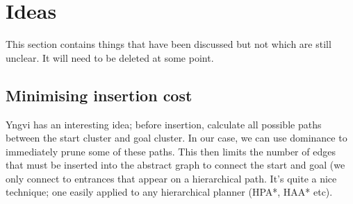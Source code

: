\section{Ideas}
This section contains things that have been discussed but not which are still unclear. 
It will need to be deleted at some point.

\subsection{Minimising insertion cost}
Yngvi has an interesting idea; before insertion, calculate all possible paths between the start cluster and goal cluster. 
In our case, we can use dominance to immediately prune some of these paths. 
This then limits the number of edges that must be inserted into the abstract graph to connect the start and goal (we only connect to entrances that appear on a hierarchical path.
It's quite a nice technique; one easily applied to any hierarchical planner (HPA*, HAA* etc).

